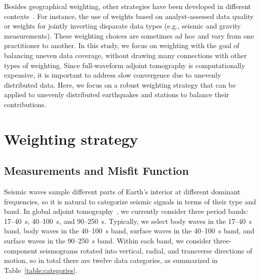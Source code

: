 Besides geographical weighting, 
other strategies have been developed in different contexts~\cite{grand1994, s362ani, ritsema2011s40rts, Moulik2016}.
For instance, the use of weights based on analyst-assessed data quality or weights for jointly inverting disparate data types (e.g., seismic and gravity measurements). 
These weighting choices are sometimes ad hoc and vary from one practitioner to another.
In this study, we focus on weighting with the goal of balancing uneven data coverage, without drawing many connections with other types of weighting.
Since full-waveform adjoint tomography is computationally expensive, it is important to address slow convergence due to unevenly distributed data.  
Here, we focus on a robust weighting strategy that can be applied to 
unevenly distributed earthquakes and stations to balance their contributions.

\section{Weighting strategy}
\label{sec:dataproc}

\subsection{Measurements and Misfit Function}

Seismic waves sample different parts of Earth's interior at different dominant frequencies, so it is natural to 
categorize seismic signals in terms of their type and band.
In global adjoint tomography~\cite{bozdaug2016global, Lei2018}, we currently consider three period 
bands: 17--40~s,  40--100~s, and 90--250~s. 
Typically, we select body waves in the 17--40~s band,
body waves in the 40--100~s band,
surface waves in the 40--100~s band,
and surface waves in the 90--250~s band.
Within each band, we consider three-component 
seismograms rotated into vertical, radial, and transverse directions 
of motion, so in total there are twelve data categories, as summarized in 
Table~\ref{table:categories}. 

